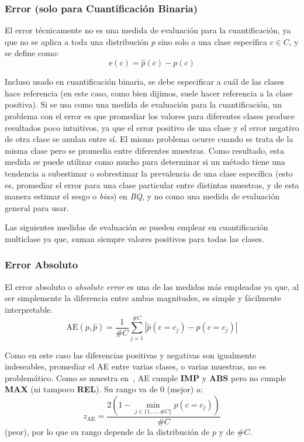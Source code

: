 \subsubsection{Error {\normalfont(solo para Cuantificación
Binaria)}}\label{evaluacion:error}

El error técnicamente no es una medida de evaluación para la cuantificación, ya
que no se aplica a toda una distribución $p$ sino solo a una clase específica $c
\in C$, y se define como:
\begin{equation}
    {\text{e}(c)} = \hat p(c) - p(c)\label{evaluacion:eq_e}
\end{equation}

Incluso usado en cuantificación binaria, se debe especificar a cuál de las
clases hace referencia (en este caso, como bien dijimos, suele hacer referencia
a la clase positiva). Si se usa como una medida de evaluación para la
cuantificación, un problema con el error es que promediar los valores para
diferentes clases produce resultados poco intuitivos, ya que el error positivo
de una clase y el error negativo de otra clase se anulan entre sí. El mismo
problema ocurre cuando se trata de la misma clase pero se promedia entre
diferentes muestras. Como resultado, esta medida se puede utilizar como mucho
para determinar si un método tiene una tendencia a subestimar o sobrestimar la
prevalencia de una clase específica (esto es, promediar el error para una clase
particular entre distintas muestras, y de esta manera estimar el sesgo o {\it
bias}) en {\it BQ}, y no como una medida de evaluación general para usar.

Las siguientes medidas de evaluación se pueden emplear en cuantificación
multiclase ya que, suman siempre valores positivos para todas las clases.

\subsubsection{Error Absoluto}\label{evaluacion:ae}

El error absoluto o {\it absolute error\/} es una de las medidas más empleadas
ya que, al ser simplemente la diferencia entre ambas magnitudes, es simple y
fácilmente interpretable.
\begin{equation}
    {\text{AE}(p, \hat p)} = \frac{1}{\#C}\sum \limits_{j=1}^{\#C}{|\hat p(c=c_j) - p(c=c_j)|}\label{evaluacion:eq_ae}
\end{equation}

Como en este caso las diferencias positivas y negativas son igualmente
indeseables, promediar el AE entre varias clases, o varias muestras, no es
problemático. Como se muestra en~\cite{sebastiani2020evaluation}, AE cumple {\bf
IMP} y {\bf ABS} pero no cumple {\bf MAX} (ni tampoco {\bf REL}). Su rango va de
0 (mejor) a:
\begin{equation}
    z_{\text{AE}} = \frac{2(1-\displaystyle \min_{j\in\{1,\dots,\#C\}}p(c=c_j))}{\#C}\label{evaluacion:eq_zae}
\end{equation}
(peor), por lo que su rango depende de la distribución de $p$ y de $\#C$.

